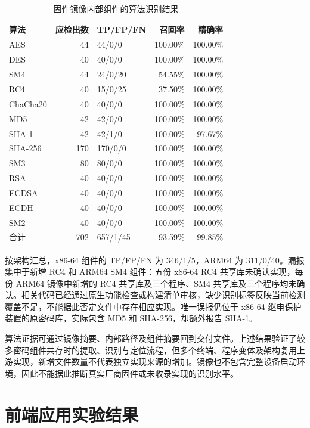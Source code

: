 \begin{table}[H]\centering\small
\caption{固件镜像内部组件的算法识别结果}
\label{tab:firmware-algorithm-results}
\begin{tabularx}{\linewidth}{@{}Xrlrr@{}}\toprule
算法 & 应检出数 & TP/FP/FN & 召回率 & 精确率\\\midrule
AES & 44 & 44/0/0 & 100.00\% & 100.00\%\\
DES & 40 & 40/0/0 & 100.00\% & 100.00\%\\
SM4 & 44 & 24/0/20 & 54.55\% & 100.00\%\\
RC4 & 40 & 15/0/25 & 37.50\% & 100.00\%\\
ChaCha20 & 40 & 40/0/0 & 100.00\% & 100.00\%\\
MD5 & 42 & 42/0/0 & 100.00\% & 100.00\%\\
SHA-1 & 42 & 42/1/0 & 100.00\% & 97.67\%\\
SHA-256 & 170 & 170/0/0 & 100.00\% & 100.00\%\\
SM3 & 80 & 80/0/0 & 100.00\% & 100.00\%\\
RSA & 40 & 40/0/0 & 100.00\% & 100.00\%\\
ECDSA & 40 & 40/0/0 & 100.00\% & 100.00\%\\
ECDH & 40 & 40/0/0 & 100.00\% & 100.00\%\\
SM2 & 40 & 40/0/0 & 100.00\% & 100.00\%\\
合计 & 702 & 657/1/45 & 93.59\% & 99.85\%\\\bottomrule
\end{tabularx}
\end{table}

按架构汇总，x86-64 组件的 TP/FP/FN 为 346/1/5，ARM64 为 311/0/40。漏报集中于新增 RC4 和 ARM64 SM4 组件：五份 x86-64 RC4 共享库未确认实现，每份 ARM64 镜像中新增的 RC4 共享库及三个程序、SM4 共享库及三个程序均未确认。相关代码已经通过原生功能检查或构建清单审核，缺少识别标签反映当前检测覆盖不足，不能据此否定文件中存在相应实现。唯一误报仍位于 x86-64 继电保护装置的原密码库，实际包含 MD5 和 SHA-256，却额外报告 SHA-1。

算法证据可通过镜像摘要、内部路径及组件摘要回到交付文件。上述结果验证了较多密码组件共存时的提取、识别与定位流程，但多个终端、程序变体及架构复用上游实现，新增文件数量不代表独立实现来源的增加。镜像也不包含完整设备启动环境，因此不能据此推断真实厂商固件或未收录实现的识别水平。

\section{前端应用实验结果}
\label{sec:frontend-results}

